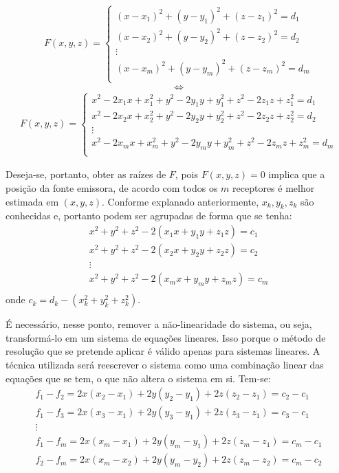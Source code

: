 	\begin{align*}
		F(x,y,z) =
		\left \{
		\begin{array}{cl}
			(x - x_1)^2 + (y - y_1)^2 + (z - z_1)^2 = d_1\\
			(x - x_2)^2 + (y - y_2)^2 + (z - z_2)^2 = d_2\\
			\vdots \\
			(x - x_m)^2 + (y - y_m)^2 + (z - z_m)^2 = d_m\\
		\end{array}
		\right.
	\end{align*}
	$$\iff$$
	\begin{align*}
		F(x,y,z) =
		\left \{
		\begin{array}{cl}
			x^2 - 2x_1x + x_1^2 + y^2 - 2y_1y + y_1^2 + z^2 - 2z_1z + z_1^2 = d_1\\
			x^2 - 2x_2x + x_2^2 + y^2 - 2y_2y + y_2^2 + z^2 - 2z_2z + z_2^2 = d_2\\
			\vdots \\
			x^2 - 2x_mx + x_m^2 + y^2 - 2y_my + y_m^2 + z^2 - 2z_mz + z_m^2 = d_m\\
		\end{array}
		\right.
	\end{align*}

	Deseja-se, portanto, obter as raízes de $F$, pois $F(x,y,z) = 0$ implica que a posição
	da fonte emissora, de acordo com todos os $m$ receptores é melhor estimada em $(x,y,z)$.
	Conforme explanado anteriormente, $x_k, y_k, z_k$ são conhecidas e, portanto podem ser
	agrupadas de forma que se tenha:
	\[
	\begin{array}{cl}
		x^2 + y^2 + z^2 - 2(x_1x + y_1y + z_1z) = c_1\\
		x^2 + y^2 + z^2 - 2(x_2x + y_2y + z_2z) = c_2\\
		\vdots \\
		x^2 + y^2 + z^2 - 2(x_mx + y_my + z_mz) = c_m\\
	\end{array}
	\]
	onde $c_k = d_k - (x_k^2 + y_k^2 + z_k^2)$.

	É necessário, nesse ponto, remover a não-linearidade do sistema, ou seja, transformá-lo
	em um sistema de equações lineares. Isso porque o método de resolução que se pretende
	aplicar é válido apenas para sistemas lineares. A técnica utilizada será reescrever o sistema
	como uma combinação linear das equações que se tem, o que não altera o sistema em si. Tem-se:
	\[
	\begin{array}{cl}
		f_1-f_2 = 2x(x_2-x_1) + 2y(y_2-y_1) + 2z(z_2-z_1) = c_2-c_1\\
		f_1-f_3 = 2x(x_3-x_1) + 2y(y_3-y_1) + 2z(z_3-z_1) = c_3-c_1\\
		\vdots \\
		f_1-f_m = 2x(x_m-x_1) + 2y(y_m-y_1) + 2z(z_m-z_1) = c_m-c_1\\
		f_2-f_m = 2x(x_m-x_2) + 2y(y_m-y_2) + 2z(z_m-z_2) = c_m-c_2\\
	\end{array}
	\]

